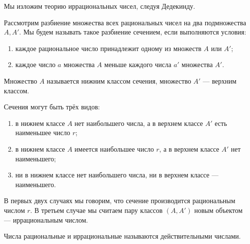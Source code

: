 \begin{rusblock}
Мы изложим теорию иррациональных чисел, следуя Дедекинду.

Рассмотрим разбиение множества всех рациональных чисел на два подмножества $A,A'$. Мы будем называть такое разбиение сечением, если выполняются условия:
\begin{enumerate}[label=\arabic*.,leftmargin=2.2em]
\item каждое рациональное число принадлежит одному из множеств $A$ или $A'$;
\item каждое число $a$ множества $A$ меньше каждого числа $a'$ множества $A'$.
\end{enumerate}
Множество $A$ называется нижним классом сечения, множество $A'$ --- верхним классом.

Сечения могут быть трёх видов:
\begin{enumerate}[label=(\arabic*),leftmargin=2.2em]
\item в нижнем классе $A$ нет наибольшего числа, а в верхнем классе $A'$ есть наименьшее число $r$;
\item в нижнем классе $A$ имеется наибольшее число $r$, а в верхнем классе $A'$ нет наименьшего;
\item ни в нижнем классе нет наибольшего числа, ни в верхнем классе --- наименьшего.
\end{enumerate}
В первых двух случаях мы говорим, что сечение производится рациональным числом $r$. В третьем случае мы считаем пару классов $(A,A')$ новым объектом --- иррациональным числом.

Числа рациональные и иррациональные называются действительными числами.
\end{rusblock}

